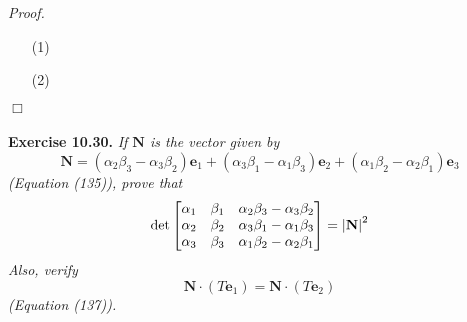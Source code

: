 \documentclass{article}
\begin{document}
\emph{Proof.}
\begin{enumerate}
\item[(1)]

\item[(2)]

\end{enumerate}
$\Box$ \\\\






\textbf{Exercise 10.30.}
\emph{If $\mathbf{N}$ is the vector given by
\[
  \mathbf{N}
  = (\alpha_2 \beta_3 - \alpha_3 \beta_2) \mathbf{e}_1
    + (\alpha_3 \beta_1 - \alpha_1 \beta_3) \mathbf{e}_2
    + (\alpha_1 \beta_2 - \alpha_2 \beta_1) \mathbf{e}_3
\]
(Equation (135)), prove that
\[
  \det\begin{bmatrix}
    \alpha_1 & \beta_1 & \alpha_2 \beta_3 - \alpha_3 \beta_2 \\
    \alpha_2 & \beta_2 & \alpha_3 \beta_1 - \alpha_1 \beta_3 \\
    \alpha_3 & \beta_3 & \alpha_1 \beta_2 - \alpha_2 \beta_1
  \end{bmatrix}
  = \abs{\mathbf{N}}^2
\]
Also, verify
\[
  \mathbf{N} \cdot (T\mathbf{e}_1) = \mathbf{N} \cdot (T\mathbf{e}_2)
\]
(Equation (137)).} \\
\end{document}
